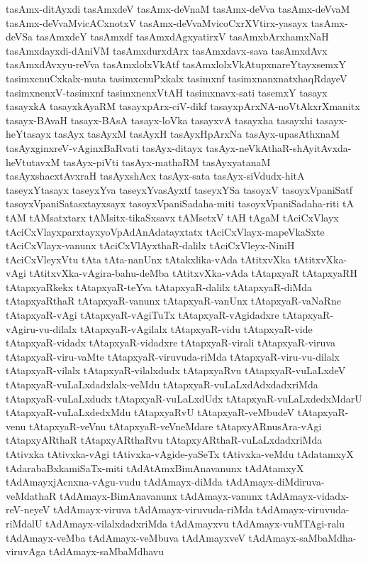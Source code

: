 {tasAmx-ditAyxdi
tasAmxdeV
tasAmx-deVnaM
tasAmx-deVva
tasAmx-deVvaM
tasAmx-deVvaMvicACxnotxV
tasAmx-deVvaMvicoCxrXVtirx-yasayx
tasAmx-deVSa
tasAmxdeY
tasAmxdf
tasAmxdAgxyatirxV
tasAmxbArxhamxNaH
tasAmxdayxdi-dAniVM
tasAmxdurxdArx
tasAmxdavx-sava
tasAmxdAvx
tasAmxdAvxyu-reVva
tasAmxlolxVkAtf
tasAmxlolxVkAtupxnareYtayxsemxY
tasimxcnuCxkalx-muta
tasimxcnuPxkalx
tasimxnf
tasimxnanxnatxhaqRdayeV
tasimxnenxV-tasimxnf
tasimxnenxVtAH
tasimxnavx-sati
tasemxY
tasayx
tasayxkA
tasayxkAyaRM
tasayxpArx-ciV-dikf
tasayxpArxNA-noVtAkxrXmanitx
tasayx-BAvaH
tasayx-BAsA
tasayx-loVka
tasayxvA
tasayxha
tasayxhi
tasayx-heYtasayx
tasAyx
tasAyxM
tasAyxH
tasAyxHpArxNa
tasAyx-upasAthxnaM
tasAyxginxreV-vAginxBaRvati
tasAyx-ditayx
tasAyx-neVkAthaR-shAyitAvxda-heVtutavxM
tasAyx-piVti
tasAyx-mathaRM
tasAyxyatanaM
tasAyxshacxtAvxraH
tasAyxshAcx
tasAyx-sata
tasAyx-siVdudx-hitA
taseyxYtasayx
taseyxYva
taseyxYvasAyxtf
taseyxYSa
tasoyxV
tasoyxVpaniSatf
tasoyxVpaniSatasxtayxsayx
tasoyxVpaniSadaha-miti
tasoyxVpaniSadaha-riti
tA
tAM
tAMsatxtarx
tAMsitx-tikaSxsavx
tAMsetxV
tAH
tAgaM
tAciCxVlayx
tAciCxVlayxparxtayxyoVpAdAnAdatayxtatx
tAciCxVlayx-mapeVkaSxte
tAciCxVlayx-vanunx
tAciCxVlAyxthaR-dalilx
tAciCxVleyx-NiniH
tAciCxVleyxVtu
tAta
tAta-nanUnx
tAtakxlika-vAda
tAtitxvXka
tAtitxvXka-vAgi
tAtitxvXka-vAgira-bahu-deMba
tAtitxvXka-vAda
tAtapxyaR
tAtapxyaRH
tAtapxyaRkekx
tAtapxyaR-teYva
tAtapxyaR-dalilx
tAtapxyaR-diMda
tAtapxyaRthaR
tAtapxyaR-vanunx
tAtapxyaR-vanUnx
tAtapxyaR-vaNaRne
tAtapxyaR-vAgi
tAtapxyaR-vAgiTuTx
tAtapxyaR-vAgidadxre
tAtapxyaR-vAgiru-vu-dilalx
tAtapxyaR-vAgilalx
tAtapxyaR-vidu
tAtapxyaR-vide
tAtapxyaR-vidadx
tAtapxyaR-vidadxre
tAtapxyaR-virali
tAtapxyaR-viruva
tAtapxyaR-viru-vaMte
tAtapxyaR-viruvuda-riMda
tAtapxyaR-viru-vu-dilalx
tAtapxyaR-vilalx
tAtapxyaR-vilalxdudx
tAtapxyaRvu
tAtapxyaR-vuLaLxdeV
tAtapxyaR-vuLaLxdadxlalx-veMdu
tAtapxyaR-vuLaLxdAdxdadxriMda
tAtapxyaR-vuLaLxdudx
tAtapxyaR-vuLaLxdUdx
tAtapxyaR-vuLaLxdedxMdarU
tAtapxyaR-vuLaLxdedxMdu
tAtapxyaRvU
tAtapxyaR-veMbudeV
tAtapxyaR-venu
tAtapxyaR-veVnu
tAtapxyaR-veVneMdare
tAtapxyARnusAra-vAgi
tAtapxyARthaR
tAtapxyARthaRvu
tAtapxyARthaR-vuLaLxdadxriMda
tAtivxka
tAtivxka-vAgi
tAtivxka-vAgide-yaSeTx
tAtivxka-veMdu
tAdatamxyX
tAdarabaBxkamiSaTx-miti
tAdAtAmxBimAnavanunx
tAdAtamxyX
tAdAmayxjAcnxna-vAgu-vudu
tAdAmayx-diMda
tAdAmayx-diMdiruva-veMdathaR
tAdAmayx-BimAnavanunx
tAdAmayx-vanunx
tAdAmayx-vidadx-reV-neyeV
tAdAmayx-viruva
tAdAmayx-viruvuda-riMda
tAdAmayx-viruvuda-riMdalU
tAdAmayx-vilalxdadxriMda
tAdAmayxvu
tAdAmayx-vuMTAgi-ralu
tAdAmayx-veMba
tAdAmayx-veMbuva
tAdAmayxveV
tAdAmayx-saMbaMdha-viruvAga
tAdAmayx-saMbaMdhavu
}
